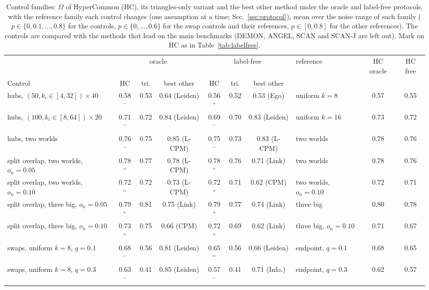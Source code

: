 \begin{table}[p]
\caption{Control families: $\Omega$ of HyperCommon (HC), its triangles-only variant and the best other method under the oracle and label-free protocols, with the reference family each control changes (one assumption at a time; Sec.~\ref{sec:protocol}), mean over the noise range of each family ($p\in\{0,0.1,\dots,0.8\}$ for the controls, $p\in\{0,\dots,0.6\}$ for the swap controls and their references, $p\in[0,0.8]$ for the other references). The controls are compared with the methods that lead on the main benchmarks (DEMON, ANGEL, SCAN and SCAN-J are left out). Mark on HC as in Table~\ref{tab:labelfree}.}
\label{tab:S-controls}
\scriptsize\setlength{\tabcolsep}{2pt}
\begin{ruledtabular}
\begin{tabular}{lcccccc|lcc}
 & \multicolumn{3}{c}{oracle} & \multicolumn{3}{c|}{label-free} & reference & HC oracle & HC free \\
Control & HC & tri. & best other & HC & tri. & best other & & & \\
\hline
hubs, $(50,k_i\in[4,32])\times40$ & 0.58$^{-}$ & 0.53 & 0.64 (Leiden) & 0.56$^{+}$ & 0.52 & 0.53 (Ego) & uniform $k{=}8$ & 0.57 & 0.55 \\
hubs, $(100,k_i\in[8,64])\times20$ & 0.71$^{-}$ & 0.72 & 0.84 (Leiden) & 0.69$^{-}$ & 0.70 & 0.83 (Leiden) & uniform $k{=}16$ & 0.73 & 0.72 \\
hubs, two worlds & 0.76$^{-}$ & 0.75 & 0.85 (L-CPM) & 0.75$^{-}$ & 0.73 & 0.83 (L-CPM) & two worlds & 0.78 & 0.76 \\
split overlap, two worlds, $o_n{=}0.05$ & 0.78$^{=}$ & 0.77 & 0.78 (L-CPM) & 0.78$^{+}$ & 0.76 & 0.71 (Link) & two worlds & 0.78 & 0.76 \\
split overlap, two worlds, $o_n{=}0.10$ & 0.72$^{=}$ & 0.72 & 0.73 (L-CPM) & 0.72$^{+}$ & 0.71 & 0.62 (CPM) & two worlds, $o_n{=}0.10$ & 0.72 & 0.71 \\
split overlap, three big, $o_n{=}0.05$ & 0.79$^{+}$ & 0.81 & 0.75 (Link) & 0.79$^{+}$ & 0.77 & 0.74 (Link) & three big & 0.80 & 0.78 \\
split overlap, three big, $o_n{=}0.10$ & 0.73$^{+}$ & 0.75 & 0.66 (CPM) & 0.72$^{+}$ & 0.69 & 0.62 (Link) & three big, $o_n{=}0.10$ & 0.71 & 0.67 \\
swaps, uniform $k{=}8$, $q{=}0.1$ & 0.68$^{-}$ & 0.56 & 0.81 (Leiden) & 0.65$^{=}$ & 0.56 & 0.66 (Leiden) & endpoint, $q{=}0.1$ & 0.68 & 0.65 \\
swaps, uniform $k{=}8$, $q{=}0.3$ & 0.63$^{-}$ & 0.41 & 0.85 (Leiden) & 0.57$^{-}$ & 0.41 & 0.71 (Info.) & endpoint, $q{=}0.3$ & 0.62 & 0.57 \\

\end{tabular}
\end{ruledtabular}
\end{table}
